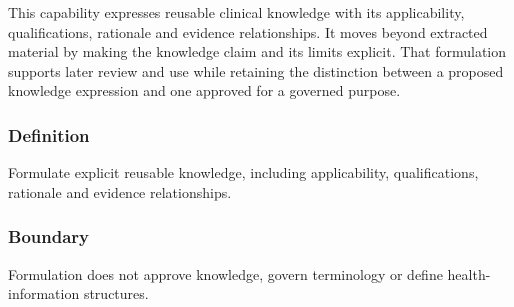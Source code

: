 This capability expresses reusable clinical knowledge with its applicability, qualifications, rationale and evidence relationships. It moves beyond extracted material by making the knowledge claim and its limits explicit. That formulation supports later review and use while retaining the distinction between a proposed knowledge expression and one approved for a governed purpose.

\subsubsection*{Definition}

Formulate explicit reusable knowledge, including applicability, qualifications, rationale and evidence relationships.

\subsubsection*{Boundary}

Formulation does not approve knowledge, govern terminology or define health-information structures.

